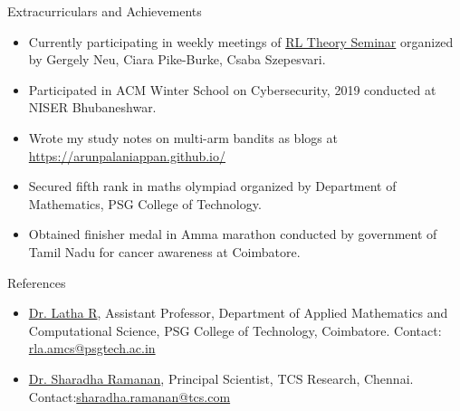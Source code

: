 \documentclass{resume} %
\begin{document}
\begin{rSection}{Extracurriculars and Achievements}
\vspace*{0.1in}
\begin{itemize}[leftmargin=*]
\item Currently participating in weekly meetings of \href{https://sites.google.com/view/rltheoryseminars/next-seminar}{RL Theory Seminar} organized by Gergely Neu, Ciara Pike-Burke, Csaba Szepesvari.
\item Participated in ACM Winter School on Cybersecurity, 2019 conducted at NISER Bhubaneshwar.
\item Wrote my study notes on multi-arm bandits as blogs at \href{https://arunpalaniappan.github.io/}{https://arunpalaniappan.github.io/}
\item Secured fifth rank in maths olympiad organized by Department of Mathematics, PSG College of Technology.
\item Obtained finisher medal in Amma marathon conducted by government of Tamil Nadu for cancer awareness at Coimbatore.
\end{itemize}
\end{rSection}

\begin{rSection}{References}
\begin{itemize}[leftmargin=*]
\item \href{https://www.psgtech.edu/facgen.php?id=C3150}{Dr. Latha R}, Assistant Professor,  Department of Applied Mathematics and Computational Science, PSG College of Technology, Coimbatore. Contact: \href{mailto:rla.amcs@psgtech.ac.in}{rla.amcs@psgtech.ac.in}
\item \href{https://www.linkedin.com/in/sharadha-ramanan-43bb4946/}{Dr. Sharadha Ramanan}, Principal Scientist, TCS Research, Chennai. Contact:\href{mailto:sharadha.ramanan@tcs.com}{sharadha.ramanan@tcs.com}
\end{itemize}
\end{rSection}

\end{document}
